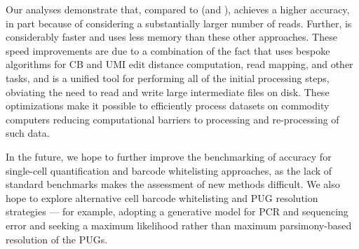 Our analyses demonstrate that, compared to \cellr (and \naive), \alevin achieves
a higher accuracy, in part because of considering a substantially larger number
of reads. Further, \alevin is considerably faster and uses less memory than
these other approaches. These speed improvements are due to a combination of the
fact that \alevin uses bespoke algorithms for CB and UMI edit distance
computation, read mapping, and other tasks, and is a unified tool for performing
all of the initial processing steps, obviating the need to read and write large
intermediate files on disk. These optimizations make it possible to efficiently
process \dscrnaseq datasets on commodity computers reducing computational
barriers to processing and re-processing of such data.

In the future, we hope to further improve the benchmarking of accuracy
  for single-cell quantification and barcode whitelisting approaches, as the
  lack of standard benchmarks makes the assessment of new methods difficult. We
  also hope to explore alternative cell barcode whitelisting and PUG resolution strategies --- for example,
  adopting a generative model for PCR and sequencing error and seeking a maximum
  likelihood rather than maximum parsimony-based resolution of the PUGs.

